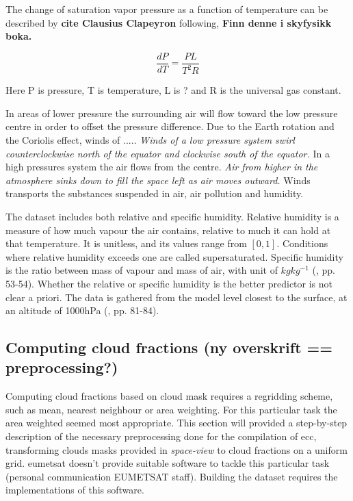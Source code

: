 The change of saturation vapor pressure as a function of temperature can be described by  \textbf{cite Clausius Clapeyron} following, \textbf {Finn denne i skyfysikk boka.}

\begin{equation} \label{eq:clausius-claperon}
    \frac{dP}{dT} = \frac{PL}{T^2R}
\end{equation}

Here P is pressure, T is temperature, L is ? and R is the universal gas constant.

In areas of lower pressure the surrounding air will flow toward the low pressure centre in order to offset the pressure difference. Due to the Earth rotation and the Coriolis effect, winds of ..... \textit{Winds of a low pressure system swirl counterclockwise north of the equator and clockwise south of the equator.} In a high pressures system the air flows from the centre. \textit{Air from higher in the atmosphere sinks down to fill the space left as air moves outward.} Winds transports the substances suspended in air, air pollution and humidity.

The dataset includes both relative and specific humidity. Relative humidity is a measure of how much vapour the air contains, relative to much it can hold at that temperature. It is unitless, and its values range from $\left[ 0, 1 \right]$.  Conditions where relative humidity exceeds one are called supersaturated. Specific humidity is the ratio between mass of vapour and mass of air, with unit of $kg kg^{-1}$ (\cite{lohmann2016}, pp. 53-54). Whether the relative or specific humidity is the better predictor is not clear a priori. The data is gathered from the model level closest to the surface, at an altitude of 1000hPa (\cite{lohmann2016}, pp. 81-84). 

\subsection{Computing cloud fractions (ny overskrift == preprocessing?)} \label{sec:remapping}

Computing cloud fractions based on cloud mask requires a regridding scheme, such as mean, nearest neighbour or area weighting. For this particular task the area weighted seemed most appropriate. This section will provided a step-by-step description of the necessary preprocessing done for the compilation of \acrshort{ecc}, transforming clouds masks provided in \textit{space-view} to cloud fractions on a uniform grid. \acrshort{eumetsat} doesn't provide suitable software to tackle this particular task (personal communication EUMETSAT staff). Building the dataset requires the implementations of this software.

